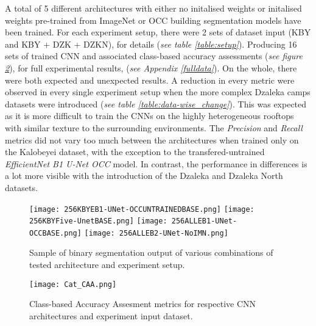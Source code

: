 \documentclass[11pt, a4paper, twoside]{report}
\begin{document}
A total of 5 different architectures with either no initalised weights or initalised weights pre-trained from ImageNet or OCC building segmentation models have been trained. For each experiment setup, there were 2 sets of dataset input (KBY and KBY + DZK + DZKN), for details (\textit{see table \ref{table:setup}}). Producing 16 sets of trained CNN and associated class-based accuracy assessments (\textit{see figure \ref{fig:Cat_CAA}}), for full experimental results, (\textit{see Appendix \ref{fulldata}}). On the whole, there were both expected and unexpected results. A reduction in every metric were observed in every single experiment setup when the more complex Dzaleka camps datasets were introduced (\textit{see table \ref{table:data-wise_change}}). This was expected as it is more difficult to train the CNNs on the highly heterogeneous rooftops with similar texture to the surrounding environments. The \textit{Precision} and \textit{Recall} metrics did not vary too much between the architectures when trained only on the Kalobeyei dataset, with the exception to the transfered-untrained \textit{EfficientNet B1 U-Net OCC} model. In contrast, the performance in differences is a lot more visible with the introduction of the Dzaleka and Dzaleka North datasets.\\\par

\begin{figure}[H]
  \centering
  \texttt{[image: 256KBYEB1-UNet-OCCUNTRAINEDBASE.png]}
  \texttt{[image: 256KBYFive-UnetBASE.png]}
  \texttt{[image: 256ALLEB1-UNet-OCCBASE.png]}
  \texttt{[image: 256ALLEB2-UNet-NoIMN.png]}
  \caption{Sample of binary segmentation output of various combinations of tested architecture and experiment setup.}
  \label{fig:output}
\end{figure}

\newpage

\begin{landscape}
\begin{figure}[H]
  \centering
  \texttt{[image: Cat\_CAA.png]}
  \caption{Class-based Accuracy Assesment metrics for respective CNN architectures and experiment input dataset.}
  \label{fig:Cat_CAA}
\end{figure}
\end{landscape}

\newpage
\end{document}
